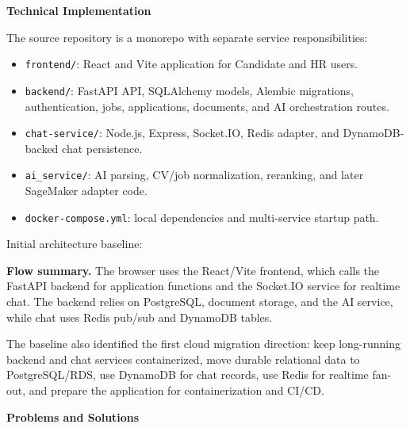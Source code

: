 \vspace{0.5em}\noindent\textbf{Technical Implementation}\par

The source repository is a monorepo with separate service
responsibilities:

\begin{itemize}
\tightlist
\item
  \texttt{frontend/\allowbreak{}}: React and Vite application for Candidate and HR
  users.
\item
  \texttt{backend/\allowbreak{}}: FastAPI API, SQLAlchemy models, Alembic migrations,
  authentication, jobs, applications, documents, and AI orchestration
  routes.
\item
  \texttt{chat-\allowbreak{}service/\allowbreak{}}: Node.js, Express, Socket.IO, Redis adapter,
  and DynamoDB-backed chat persistence.
\item
  \texttt{ai\_\allowbreak{}service/\allowbreak{}}: AI parsing, CV/job normalization, reranking,
  and later SageMaker adapter code.
\item
  \texttt{docker-\allowbreak{}compose.\allowbreak{}yml}: local dependencies and multi-service
  startup path.
\end{itemize}

Initial architecture baseline:

\textbf{Flow summary.} The browser uses the React/Vite frontend, which
calls the FastAPI backend for application functions and the Socket.IO
service for realtime chat. The backend relies on PostgreSQL, document
storage, and the AI service, while chat uses Redis pub/sub and DynamoDB
tables.

The baseline also identified the first cloud migration direction: keep
long-running backend and chat services containerized, move durable
relational data to PostgreSQL/RDS, use DynamoDB for chat records, use
Redis for realtime fan-out, and prepare the application for
containerization and CI/CD.

\vspace{0.5em}\noindent\textbf{Problems and Solutions}\par

